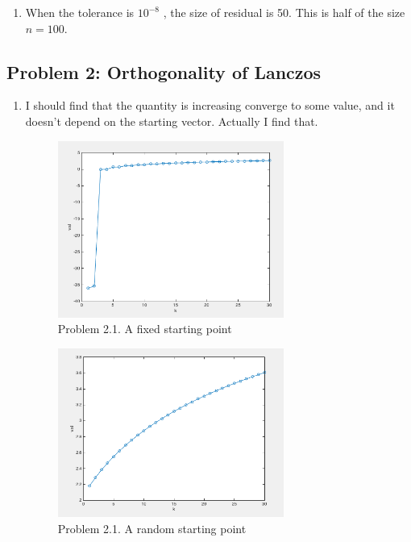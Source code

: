 \documentclass{article}
\begin{document}
\begin{enumerate}
\item
When the tolerance is $10^{-8}$ , the size of residual is 50.    This is half of the size $n=100$. 


\end{enumerate} 

\hypertarget{}{}
\subsection*{{Problem 2: Orthogonality of Lanczos }}
\label{}

\begin{enumerate} 
\item 
I should find that the quantity is increasing converge to some value, and it doesn't depend on the starting vector.  Actually I find that. 
\begin{figure} 
\includegraphics[width=0.7\textwidth]{problem2_1_fix}
\centering
\caption{Problem 2.1.  A fixed starting point} 
\end{figure} 
\begin{figure} 
\includegraphics[width=0.7\textwidth]{problem2_1_random}
\centering
\caption{Problem 2.1.  A random starting point} 
\end{figure} 


\end{enumerate}
\end{document}
